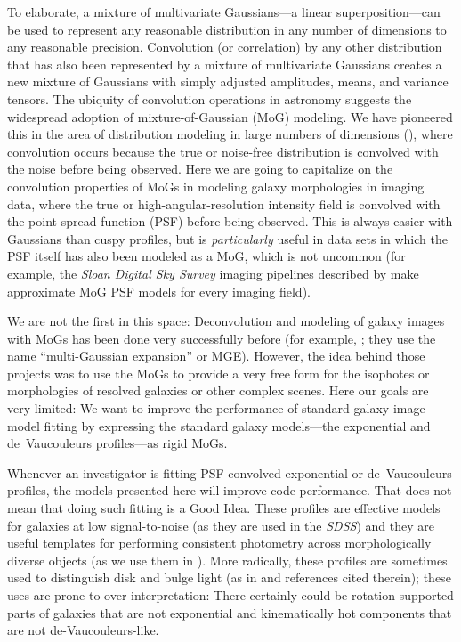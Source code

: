 \documentclass[12pt,pdftex,preprint]{aastex}
\newcommand{\project}[1]{\textsl{#1}}
\begin{document}
To elaborate, a mixture of multivariate Gaussians---a linear
superposition---can be used to represent any reasonable distribution
in any number of dimensions to any reasonable precision.  Convolution
(or correlation) by any other distribution that has also been
represented by a mixture of multivariate Gaussians creates a new
mixture of Gaussians with simply adjusted amplitudes, means, and
variance tensors.  The ubiquity of convolution operations in astronomy
suggests the widespread adoption of mixture-of-Gaussian (MoG)
modeling.  We have pioneered this in the area of distribution modeling
in large numbers of dimensions (\citealt{xd, xdqso, xdqsoz}), where
convolution occurs because the true or noise-free distribution is
convolved with the noise before being observed.  Here we are going to
capitalize on the convolution properties of MoGs in modeling galaxy
morphologies in imaging data, where the true or
high-angular-resolution intensity field is convolved with the
point-spread function (PSF) before being observed.  This is always
easier with Gaussians than cuspy profiles, but is \emph{particularly}
useful in data sets in which the PSF itself has also been modeled as a
MoG, which is not uncommon (for example, the \project{Sloan Digital
  Sky Survey} imaging pipelines described by \citealt{lupton} make
approximate MoG PSF models for every imaging field).

We are not the first in this space: Deconvolution and modeling of
galaxy images with MoGs has been done very successfully before (for
example, \citealt{bendinelli, emsellem, bendinelli2, kochanek, cappellari}; they
use the name ``multi-Gaussian expansion'' or MGE).  However, the idea
behind those projects was to use the MoGs to provide a very free form
for the isophotes or morphologies of resolved galaxies or other
complex scenes.  Here our goals are very limited: We want to improve
the performance of standard galaxy image model fitting by expressing
the standard galaxy models---the exponential and de~Vaucouleurs
profiles---as rigid MoGs.

Whenever an investigator is fitting PSF-convolved exponential or
de~Vaucouleurs profiles, the models presented here will improve code
performance.  That does not mean that doing such fitting is a Good
Idea.  These profiles are effective models for galaxies at low
signal-to-noise (as they are used in the \project{SDSS}) and they are
useful templates for performing consistent photometry across
morphologically diverse objects (as we use them in \citealt{bundy}).
More radically, these profiles are sometimes used to distinguish disk
and bulge light (as in \citealt{bulgedisk} and references cited
therein); these uses are prone to over-interpretation: There certainly
could be rotation-supported parts of galaxies that are not exponential
and kinematically hot components that are not de-Vaucouleurs-like.
\end{document}
